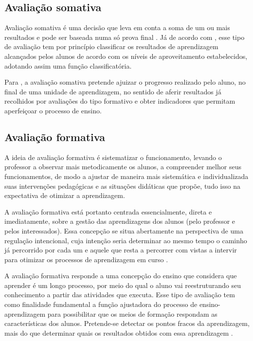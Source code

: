 \subsection{Avaliação somativa}
\label{sec:AvaSom}
Avaliação somativa é uma decisão que leva em conta a soma de um ou mais resultados e pode ser baseada numa só prova final \cite{e2004aprender}. Já de acordo com , esse tipo de avaliação tem por princípio classificar os resultados de aprendizagem alcançados pelos alunos de acordo com os níveis de aproveitamento estabelecidos, adotando assim uma função classificatória.

Para , a avaliação somativa pretende ajuizar o progresso realizado pelo aluno, no final de uma unidade de aprendizagem, no sentido de aferir resultados já recolhidos por avaliações do tipo formativo e obter indicadores que permitam aperfeiçoar o processo de ensino.

\subsection{Avaliação formativa}
\label{sec:AvaFor}
A ideia de avaliação formativa é sistematizar o funcionamento, levando o professor a observar mais metodicamente os alunos, a compreender melhor seus funcionamentos, de modo a ajustar de maneira mais sistemática e individualizada suas intervenções pedagógicas e as situações didáticas que propõe, tudo isso na expectativa de otimizar a aprendizagem. 

A avaliação formativa está portanto centrada essencialmente, direta e imediatamente, sobre a gestão das aprendizagens dos alunos (pelo professor e pelos interessados). Essa concepção se situa abertamente na perspectiva de uma regulação intencional, cuja intenção seria determinar ao mesmo tempo o caminho já percorrido por cada um e aquele que resta a percorrer com vistas a intervir para otimizar os processos de aprendizagem em curso \cite{perrenoud1999avaliaccao}.

A avaliação formativa responde a uma concepção do ensino que considera que aprender é um longo processo, por meio do qual o aluno vai reestruturando seu conhecimento a partir das atividades que executa. Esse tipo de avaliação tem como finalidade fundamental a função ajustadora do processo de ensino-aprendizagem para possibilitar que os meios de formação respondam as características dos alunos. Pretende-se detectar os pontos fracos da aprendizagem, mais do que determinar quais os resultados obtidos com essa aprendizagem \cite{jorba2003funccao}.

